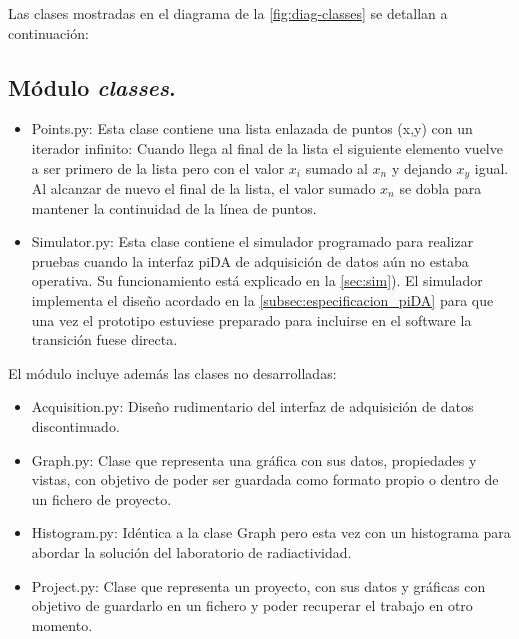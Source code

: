 	Las clases mostradas en el diagrama de la \autoref{fig:diag-classes} se detallan a continuación:
	
	\subsection{Módulo \emph{classes}.}\label{subsec:classes}
		\begin{itemize}
			\item Points.py: Esta clase contiene una lista enlazada de puntos (x,y) con un iterador infinito: Cuando llega al final de la lista el siguiente elemento vuelve a ser primero de la lista pero con el valor $ x_{i} $ sumado al $ x_n $ y dejando $ x_y $ igual. Al alcanzar de nuevo el final de la lista, el valor sumado $ x_n $ se dobla para mantener la continuidad de la línea de puntos.
			\item Simulator.py: Esta clase contiene el simulador programado para realizar pruebas cuando la interfaz piDA de adquisición de datos aún no estaba operativa. Su funcionamiento está explicado en la \autoref{sec:sim}). El simulador implementa el diseño acordado en la \autoref{subsec:especificacion_piDA} para que una vez el prototipo estuviese preparado para incluirse en el software la transición fuese directa.
		\end{itemize}
		El módulo incluye además las clases no desarrolladas:
		\begin{itemize}
			\item Acquisition.py: Diseño rudimentario del interfaz de adquisición de datos discontinuado.
			\item Graph.py: Clase que representa una gráfica con sus datos, propiedades y vistas, con objetivo de poder ser guardada como formato propio o dentro de un fichero de proyecto.
			\item Histogram.py: Idéntica a la clase Graph pero esta vez con un histograma para abordar la solución del laboratorio de radiactividad.
			\item Project.py: Clase que representa un proyecto, con sus datos y gráficas con objetivo de guardarlo en un fichero y poder recuperar el trabajo en otro momento.
		\end{itemize}
	
